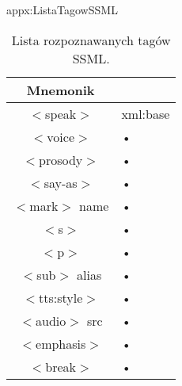 	\begin{zalacznik}{appx:ListaTagowSSML}{\visiblefalse}
	
		\begin{table}[h]
			\centering
			\caption{Lista rozpoznawanych tagów SSML.}
			\label{tab:ListaTagowSSML}
			\vspace*{6pt}
			\begin{tabular}{c p{5cm}}
				\toprule[1.2pt]
				Mnemonik & \\
				\midrule[1.2pt]
				$<$speak$>$ & xml:base \\ 
				$<$voice$>$ & • \\ 
				$<$prosody$>$ & • \\ 
				$<$say-as$>$ & • \\ 
				$<$mark$>$ name & • \\ 
				$<$s$>$ & • \\ 
				$<$p$>$ & • \\ 
				$<$sub$>$ alias & • \\ 
				$<$tts:style$>$ & • \\ 
				$<$audio$>$ src & • \\ 
				$<$emphasis$>$ & • \\ 
				$<$break$>$ & • \\
				\bottomrule[1.5pt]
			\end{tabular}
		\end{table}
		
	\end{zalacznik}

